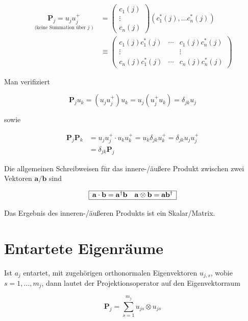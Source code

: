 \documentclass[10pt, letterpaper]{article}
\begin{document}
$$
\begin{aligned}
\underset{\text { (keine Summation über } j \text { ) }}{\mathbf{P}_{j}=u_{j} u_{j}^{+}} & =\left(\begin{array}{c}
c_{1}(j) \\
\vdots \\
c_{n}(j)
\end{array}\right)\left(c_{1}^{*}(j), \ldots c_{n}^{*}(j)\right) \\
& \equiv\left(\begin{array}{ccc}
c_{1}(j) c_{1}^{*}(j) & \cdots & c_{1}(j) c_{n}^{*}(j) \\
\vdots & & \vdots \\
c_{n}(j) c_{1}^{*}(j) & \cdots & c_{n}(j) c_{n}^{*}(j)
\end{array}\right)
\end{aligned}
$$

Man verifiziert

$$
\mathbf{P}_{j} u_{k}=\left(u_{j} u_{j}^{+}\right) u_{k}=u_{j}\left(u_{j}^{+} u_{k}\right)=\delta_{j k} u_{j}
$$

sowie

$$
\begin{aligned}
\mathbf{P}_{j} \mathbf{P}_{k} & =u_{j} u_{j}^{+} \cdot u_{k} u_{k}^{+}=u_{k} \delta_{j k} u_{k}^{+}=\delta_{j k} u_{j} u_{j}^{+} \\
& =\delta_{j k} \mathbf{P}_{j}
\end{aligned}
$$

Die allgemeinen Schreibweisen für das innere-/äußere Produkt zwischen zwei Vektoren $\mathbf{a} / \mathbf{b}$ sind

$$
\begin{array}{|ll|}
\hline \mathbf{a} \cdot \mathbf{b}=\mathbf{a}^{\dagger} \mathbf{b} & \mathbf{a} \otimes \mathbf{b}=\mathbf{a} \mathbf{b}^{\dagger} \\
\hline
\end{array}
$$

Das Ergebnis des inneren-/äußeren Produkts ist ein Skalar/Matrix.

\section*{Entartete Eigenräume}
Ist $a_{j}$ entartet, mit zugehörigen orthonormalen Eigenvektoren $u_{j, s}$, wobie $s=1, \ldots, m_{j}$, dann lautet der Projektionsoperator auf den Eigenvektorraum

$$
\mathbf{P}_{j}=\sum_{s=1}^{m_{j}} u_{j s} \otimes u_{j s}
$$
\end{document}
